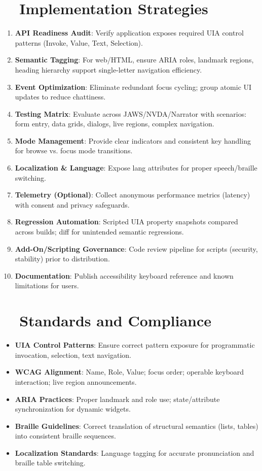 \section{~~Implementation Strategies}
\label{sec:sr-implementation}
\begin{enumerate}
	\item \textbf{API Readiness Audit}: Verify application exposes required UIA control patterns (Invoke, Value, Text, Selection).
	\item \textbf{Semantic Tagging}: For web/HTML, ensure ARIA roles, landmark regions, heading hierarchy support single-letter navigation efficiency.
	\item \textbf{Event Optimization}: Eliminate redundant focus cycling; group atomic UI updates to reduce chattiness.
	\item \textbf{Testing Matrix}: Evaluate across JAWS/NVDA/Narrator with scenarios: form entry, data grids, dialogs, live regions, complex navigation.
	\item \textbf{Mode Management}: Provide clear indicators and consistent key handling for browse vs. focus mode transitions.
	\item \textbf{Localization & Language}: Expose lang attributes for proper speech/braille switching.
	\item \textbf{Telemetry (Optional)}: Collect anonymous performance metrics (latency) with consent and privacy safeguards.
	\item \textbf{Regression Automation}: Scripted UIA property snapshots compared across builds; diff for unintended semantic regressions.
	\item \textbf{Add-On/Scripting Governance}: Code review pipeline for scripts (security, stability) prior to distribution.
	\item \textbf{Documentation}: Publish accessibility keyboard reference and known limitations for users.
\end{enumerate}

\section{~~Standards and Compliance}
\label{sec:sr-standards}
\begin{itemize}
	\item \textbf{UIA Control Patterns}: Ensure correct pattern exposure for programmatic invocation, selection, text navigation.
	\item \textbf{WCAG Alignment}: Name, Role, Value; focus order; operable keyboard interaction; live region announcements.
	\item \textbf{ARIA Practices}: Proper landmark and role use; state/attribute synchronization for dynamic widgets.
	\item \textbf{Braille Guidelines}: Correct translation of structural semantics (lists, tables) into consistent braille sequences.
	\item \textbf{Localization Standards}: Language tagging for accurate pronunciation and braille table switching.
\end{itemize}


